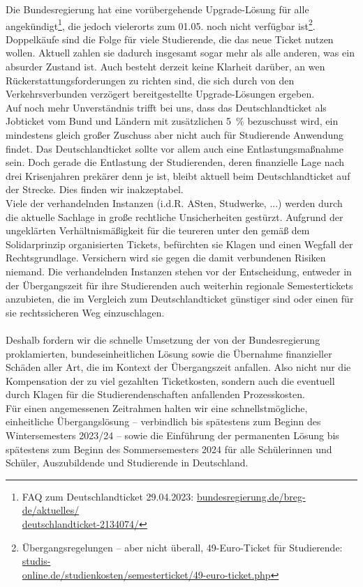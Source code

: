 \documentclass[DIV=calc]{scrartcl}
\begin{document}
Die Bundesregierung hat eine vorübergehende Upgrade-Lösung für alle angekündigt\footnote{\label{FAQ}FAQ zum Deutschlandticket 29.04.2023: \href{https://www.bundesregierung.de/breg-de/aktuelles/deutschlandticket-2134074}{bundesregierung.de/breg-de/aktuelles/\\deutschlandticket-2134074/}}, die jedoch vielerorts zum 01.05. noch nicht verfügbar ist\footnote{Übergangsregelungen – aber nicht überall, 49-Euro-Ticket für Studierende: \href{https://www.studis-online.de/studienkosten/semesterticket/49-euro-ticket.php}{studis-\\online.de/studienkosten/semesterticket/49-euro-ticket.php}}. Doppelkäufe sind die Folge für viele Studierende, die das neue Ticket nutzen wollen. Aktuell zahlen sie dadurch insgesamt sogar mehr als alle anderen, was ein absurder Zustand ist. Auch besteht derzeit keine Klarheit darüber, an wen Rückerstattungsforderungen zu richten sind, die sich durch von den Verkehrsverbunden verzögert bereitgestellte Upgrade-Lösungen ergeben.\\
%
Auf noch mehr Unverständnis trifft bei uns, dass das Deutschlandticket als Jobticket vom Bund und Ländern mit zusätzlichen \SI{5}{\percent} bezuschusst wird, ein mindestens gleich großer Zuschuss aber nicht auch für Studierende Anwendung findet. Das Deutschlandticket sollte vor allem auch eine Entlastungsmaßnahme sein. Doch gerade die Entlastung der Studierenden, deren finanzielle Lage nach drei Krisenjahren prekärer denn je ist, bleibt aktuell beim Deutschlandticket auf der Strecke. Dies finden wir inakzeptabel.\\
%
Viele der verhandelnden Instanzen (i.d.R. ASten, Studwerke, ...) werden durch die aktuelle Sachlage in große rechtliche Unsicherheiten gestürzt. Aufgrund der ungeklärten Verhältnismäßigkeit für die teureren unter den gemäß dem Solidarprinzip organisierten Tickets, befürchten sie Klagen und einen Wegfall der Rechtsgrundlage. Versichern wird sie gegen die damit verbundenen Risiken niemand. Die verhandelnden Instanzen stehen vor der Entscheidung, entweder in der Übergangszeit für ihre Studierenden auch weiterhin regionale Semestertickets anzubieten, die im Vergleich zum Deutschlandticket günstiger sind oder einen für sie rechtssicheren Weg einzuschlagen.\\\\
%
Deshalb fordern wir die schnelle Umsetzung der von der Bundesregierung proklamierten, bundeseinheitlichen Lösung sowie die Übernahme finanzieller Schäden aller Art, die im Kontext der Übergangszeit anfallen. Also nicht nur die Kompensation der zu viel gezahlten Ticketkosten, sondern auch die eventuell durch Klagen für die Studierendenschaften anfallenden Prozesskosten.\\
Für einen angemessenen Zeitrahmen halten wir eine schnellstmögliche, einheitliche Übergangslösung -- verbindlich bis spätestens zum Beginn des Wintersemesters 2023/24 -- sowie die Einführung der permanenten Lösung bis spätestens zum Beginn des Sommersemesters 2024 für alle Schülerinnen und Schüler, Auszubildende und Studierende in Deutschland.
\end{document}
